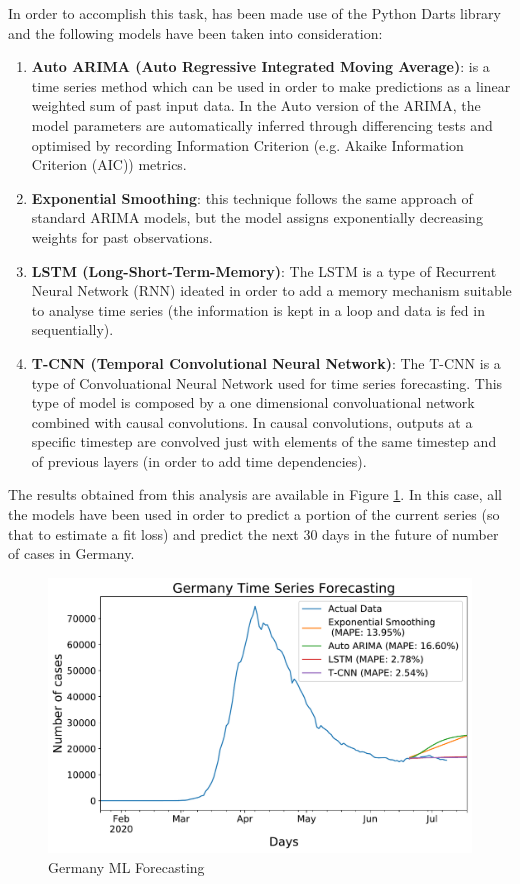 In order to accomplish this task, has been made use of the Python Darts library \cite{darts} and the following models have been taken into consideration:
\begin{enumerate}
    \item \textbf{Auto ARIMA (Auto Regressive Integrated Moving Average)}: is a time series method which can be used in order to make predictions as a linear weighted sum of past input data. In the Auto version of the ARIMA, the model parameters are automatically inferred through differencing tests and optimised by recording Information Criterion (e.g. Akaike Information Criterion (AIC)) metrics.
    \item \textbf{Exponential Smoothing}: this technique follows the same approach of standard ARIMA models, but the model assigns exponentially decreasing weights for past observations.
    \item \textbf{LSTM (Long-Short-Term-Memory)}: The LSTM is a type of Recurrent Neural Network (RNN) ideated in order to add a memory mechanism suitable to analyse time series (the information is kept in a loop and data is fed in sequentially).
    \item \textbf{T-CNN (Temporal Convolutional Neural Network)}: The T-CNN is a type of Convoluational Neural Network used for time series forecasting. This type of model is composed by a one dimensional convoluational network combined with causal convolutions. In causal convolutions, outputs at a specific timestep are convolved just with elements of the same timestep and of previous layers (in order to add time dependencies).
\end{enumerate}

The results obtained from this analysis are available in Figure \ref{ml_forecast}. In this case, all the models have been used in order to predict a portion of the current series (so that to estimate a fit loss) and predict the next 30 days in the future of number of cases in Germany.

\begin{figure}[ht!]%
    \centering
    \includegraphics[width=0.55\linewidth]{latex/images/Germany_darts.pdf}
    \vspace{-0.2cm}
    \caption{Germany ML Forecasting}
    \label{ml_forecast}
\end{figure}

